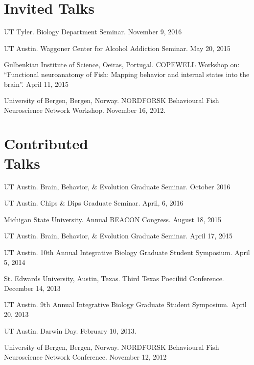 \documentclass[margin,line]{resume}
\begin{document}
\begin{resume}

\section{\mysidestyle Invited Talks}

\begin{list1}

\item[] UT Tyler. Biology Department Seminar. November 9, 2016
\item[] UT Austin. Waggoner Center for Alcohol Addiction Seminar. May 20, 2015
\item[] Gulbenkian Institute of Science, Oeiras, Portugal. COPEWELL Workshop on: “Functional neuroanatomy of Fish: Mapping behavior and internal states into the brain”. April 11, 2015
\item[] University of Bergen, Bergen, Norway. NORDFORSK Behavioural Fish Neuroscience Network Workshop. November 16, 2012.
\end{list1}



\section{\mysidestyle Contributed\\Talks}

\begin{list1}

\item[]UT Austin. Brain, Behavior, \& Evolution Graduate Seminar. October 2016
\item[]UT Austin. Chips \& Dips Graduate Seminar. April, 6, 2016
\item[]Michigan State University. Annual BEACON Congress. August 18, 2015 
\item[]UT Austin. Brain, Behavior, \& Evolution Graduate Seminar. April 17, 2015
\item[]UT Austin. 10th Annual Integrative Biology Graduate Student Symposium. April 5, 2014
\item[]St. Edwards University, Austin, Texas. Third Texas Poeciliid Conference. December 14, 2013 
\item[]UT Austin. 9th Annual Integrative Biology Graduate Student Symposium. April 20, 2013
\item[]UT Austin. Darwin Day. February 10, 2013.
\item[]University of Bergen, Bergen, Norway. NORDFORSK Behavioural Fish Neuroscience Network Conference.  November 12, 2012


\end{list1}
\end{resume}
\end{document}

